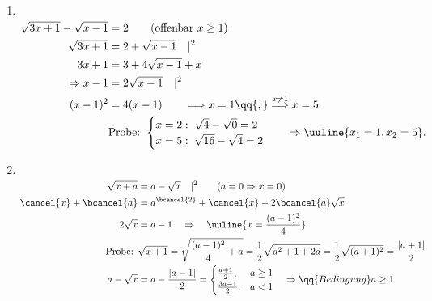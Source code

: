 \begin{enumerate}[label=(\alph*)]
    \item$~$\\[-1.4cm]
    \begin{align}
        \sqrt{3x+1}-\sqrt{x-1}&=2 \qquad \text{(offenbar $x\ge 1$)} \\
        \sqrt{3x+1} &= 2 + \sqrt{x-1} \quad |^2 \\
        3x+1 &= 3 + 4\sqrt{x-1} + x \\ 
        \Rightarrow x-1 &= 2\sqrt{x-1} \quad |^2 \\
        (x-1)^2 &= 4(x-1) \qquad \Longrightarrow x=1 \qq{,} \overset{x\neq 1}{\Longrightarrow} x=5 \\
        &\text{Probe: } \begin{cases}
            x= 2: \; \sqrt{4}-\sqrt{0} = 2\\
            x=5: \;\sqrt{16} -\sqrt{4} = 2
        \end{cases} \quad \Rightarrow \uuline{x_1 = 1, x_2 = 5}. 
    \end{align}
    \item$~$\\[-1.4cm]
    \begin{align}
        \sqrt{x+a} &=a-\sqrt{x} \quad |^2  \qquad (a= 0 \Rightarrow x=0) \\
        \cancel{x} + \bcancel{a} &= a^{\bcancel{2}} + \cancel{x} -2\bcancel{a}\sqrt{x} \\
        2\sqrt{x} &= a-1 \quad \Rightarrow \quad \uuline{x = \frac{(a-1)^2}{4}} \\
        \text{Probe: } &\sqrt{x+1} = \sqrt{\frac{(a-1)^2}{4}+a} = \frac{1}{2}\sqrt{a^2 + 1 +2a} = \frac{1}{2} \sqrt{(a+1)^2} = \frac{|a+1|}{2} \\
        a - \sqrt{x}&= a-\frac{|a-1|}{2} = \begin{cases}
            \frac{a+1}{2}, & a \ge 1 \\
            \frac{3a-1}{2}, & a < 1 
        \end{cases} \quad \Rightarrow \qq{Bedingung} a \ge 1
    \end{align}
\end{enumerate}
\newpage
